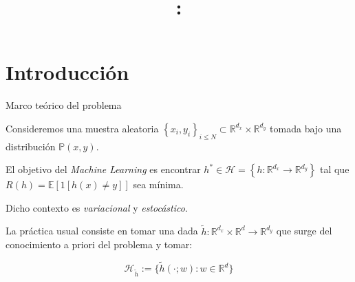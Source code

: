 \documentclass{beamer}
\title[]
{\textbf{\textcolor[rgb]{0.0,0.50,0}{\Large \myTitle: \mySubtitle}}}
\title[\myTitle: \mySubtitle]{\bf {\myTitle}}
\author[\myName]{\myName}
\institute{\myFaculty}
\date[\myTime]{\myDepartment}
\newcommand{\R}{{\mathbb{R}}}
\newcommand{\sett}[1]{\left\lbrace#1\right\rbrace}
\begin{document}
\begin{frame}

\titlepage
\vspace{-1.6cm}
\begin{center}
	
\end{center}
\end{frame}

\section{Introducci\'on}

\begin{frame}{Marco te\'orico del problema}
\nocite{bottou:2016}
\nocite{bottou:1999}
\nocite{lee:2016}
\nocite{lee:2017}
\nocite{jin:2017}

Consideremos una muestra aleatoria $\sett{x_i, y_i}_{i \leq N} \subset \R^{d_x} \times \R^{d_y}$ tomada bajo una distribuci\'on $\mathbb{P}(x,y)$.

\bigskip

El objetivo del \textit{Machine Learning} es encontrar $h^* \in \mathcal{H} = \sett{h : \R^{d_x} \rightarrow \R^{d_y}}$ tal que $R(h) = \mathbb{E} \left[1 \left[h(x) \neq y \right] \right]$ sea m\'inima.

\bigskip
\pause

Dicho contexto es \textit{variacional} y \textit{estoc\'astico}. 

\pause
\bigskip

La pr\'actica usual consiste en tomar una dada $\widetilde{h}: \R^{d_x} \times \R^d \rightarrow \R^{d_y}$ que surge del conocimiento a priori del problema y tomar:


\begin{equation*}
\mathcal{H}_{\widetilde{h}} := \lbrace \widetilde{h}(\cdot ; w): w \in \mathbb{R}^d \rbrace
\end{equation*}



\end{frame}
\end{document}
